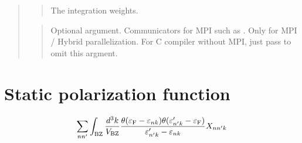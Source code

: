 \documentclass[letterpaper,10pt,pdftex,openany,english]{sphinxmanual}
\begin{document}
\begin{quote}
\begin{quote}
\sphinxAtStartPar
The integration weights.
\end{quote}

\begin{sphinxVerbatim}[commandchars=\\\{\}]
\end{sphinxVerbatim}
\begin{quote}

\sphinxAtStartPar
Optional argument. Communicators for MPI such as .
Only for MPI / Hybrid parallelization.
For C compiler without MPI, just pass  to omit this argment.
\end{quote}
\end{quote}


\section{Static polarization function}
\label{\detokenize{routine:static-polarization-function}}\begin{equation*}
\begin{split}\begin{align}
\sum_{n n'}
\int_{\rm BZ} \frac{d^3 k}{V_{\rm BZ}}
\frac{\theta(\varepsilon_{\rm F} - \varepsilon_{n k})
\theta(\varepsilon'_{n' k} - \varepsilon_{\rm F})}
{\varepsilon'_{n' k} - \varepsilon_{n k}}
X_{n n' k}
\end{align}\end{split}
\end{equation*}
\begin{sphinxVerbatim}[commandchars=\\\{\}]
\end{sphinxVerbatim}
\end{document}
